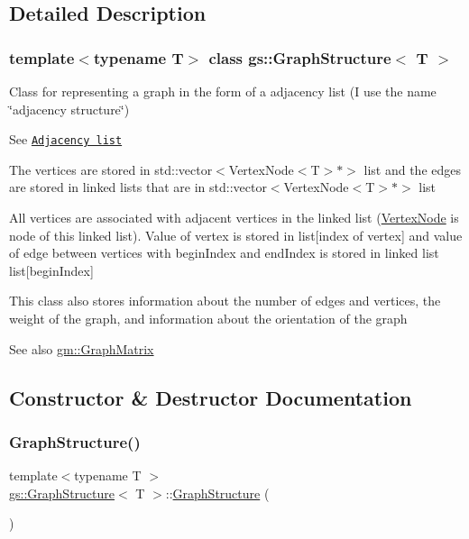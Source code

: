 \subsection{Detailed Description}
\subsubsection*{template$<$typename T$>$\newline
class gs\+::\+Graph\+Structure$<$ T $>$}

Class for representing a graph in the form of a adjacency list (I use the name \char`\"{}adjacency structure\char`\"{}) 

See \href{https://en.wikipedia.org/wiki/Adjacency_list}{\tt Adjacency list}

The vertices are stored in \textquotesingle{}std\+::vector$<$Vertex\+Node$<$\+T$>$$\ast$$>$ list\textquotesingle{} and the edges are stored in linked lists that are in \textquotesingle{}std\+::vector$<$Vertex\+Node$<$\+T$>$$\ast$$>$ list\textquotesingle{}

All vertices are associated with adjacent vertices in the linked list (\mbox{\hyperlink{structgs_1_1_vertex_node}{Vertex\+Node}} is node of this linked list). Value of vertex is stored in \textquotesingle{}list\mbox{[}index of vertex\mbox{]}\textquotesingle{} and value of edge between vertices with begin\+Index and end\+Index is stored in linked list \textquotesingle{}list\mbox{[}begin\+Index\mbox{]}\textquotesingle{}

This class also stores information about the number of edges and vertices, the weight of the graph, and information about the orientation of the graph

\begin{DoxySeeAlso}{See also}
\mbox{\hyperlink{classgm_1_1_graph_matrix}{gm\+::\+Graph\+Matrix}} 
\end{DoxySeeAlso}


\subsection{Constructor \& Destructor Documentation}
\mbox{\label{classgs_1_1_graph_structure_a5a816a9d12685c2c429958131cd950a6}} 
\subsubsection{\texorpdfstring{Graph\+Structure()}{GraphStructure()}\hspace{0.1cm}{\footnotesize\ttfamily [1/4]}}
{\footnotesize\ttfamily template$<$typename T $>$ \\
\mbox{\hyperlink{classgs_1_1_graph_structure}{gs\+::\+Graph\+Structure}}$<$ T $>$\+::\mbox{\hyperlink{classgs_1_1_graph_structure}{Graph\+Structure}} (\begin{DoxyParamCaption}{ }\end{DoxyParamCaption})}



